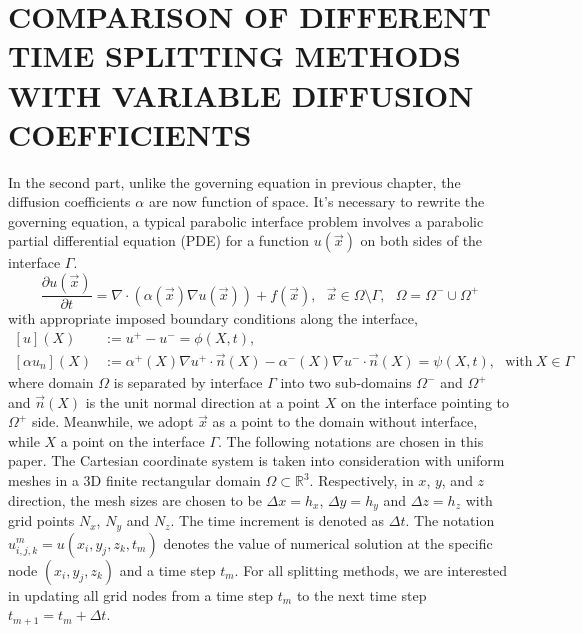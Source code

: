 \documentclass[dissertation]{uathesis}
\begin{document}
\begin{body}
\begin{flushleft}
\end{flushleft}

\chapter{\MakeUppercase{Comparison of different time splitting methods with variable diffusion coefficients}}

\begin{flushleft}

\hspace{1cm} In the second part, unlike the governing equation in previous chapter, the diffusion coefficients $\alpha$ are now function of space. It's necessary to rewrite the governing equation, a typical parabolic interface problem involves a parabolic partial differential equation (PDE) for a function $u(\vec x)$ on both sides of the interface $\Gamma$.
%
\begin{equation}\label{heat_eqn_3}
\frac{\partial u(\vec{x})}{\partial t} = \nabla \cdot (\alpha(\vec{x}) \nabla u(\vec{x})) + f(\vec{x}), ~~~ \vec{x} \in \Omega\setminus\Gamma, ~~~ \Omega =\Omega^{-} \cup \Omega^{+}
\end{equation}
%
with appropriate imposed boundary conditions along the interface, 
%
\begin{equation}\label{interface_jumps_3}
\begin{split}    
[u](X) &:= u^{+} - u^{-} = \phi(X,t), \\
[\alpha u_{n}](X) &:= \alpha^{+}(X) \nabla u^{+} \cdot \vec {n}(X) - \alpha^{-}(X) \nabla u^{-} \cdot \vec {n}(X) = \psi(X,t), ~~~ \mbox{with} ~ X \in \Gamma
\end{split}
\end{equation}
%
where domain $\Omega$ is separated by interface $\Gamma$ into two sub-domains $\Omega^{-}$ and $\Omega^{+}$ and $\vec n(X)$ is the unit normal direction at a point $X$ on the interface pointing to $\Omega^{+}$ side. Meanwhile, we adopt $\vec x$ as a point to the domain without interface, while $X$ a point on the interface $\Gamma$. The following notations are chosen in this paper. The Cartesian coordinate system is taken into consideration with uniform meshes in a 3D finite rectangular domain $\Omega \subset \mathbb{R}^{3}$. Respectively, in $x$, $y$, and $z$ direction, the mesh sizes are chosen to be $\Delta x=h_{x}$, $\Delta y=h_{y}$ and $\Delta z=h_{z}$ with grid points $N_{x}$, $N_{y}$ and $N_{z}$. The time increment is denoted as $\Delta t$. The notation $u^{m}_{i,j,k} = u(x_{i},y_{j},z_{k},t_{m})$ denotes the value of numerical solution at the specific node $(x_{i}, y_{j}, z_{k})$ and a time step $t_{m}$. For all splitting methods, we are interested in updating all grid nodes from a time step $t_{m}$ to the next time step $t_{m+1} = t_{m} + \Delta t$.
%

\end{flushleft}
\end{body}
\end{document}

